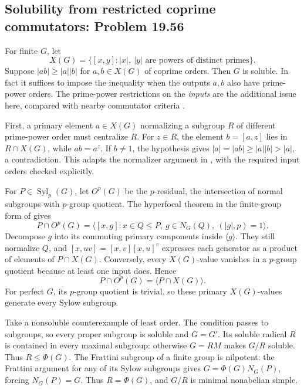 \subsection{Solubility from restricted coprime commutators: Problem 19.56}
\label{cand:19.56}

For finite \(G\), let
\[
 X(G)=\{[x,y]: |x|,\ |y|\text{ are powers of distinct primes}\}.
\]
Suppose \(|ab|\geq|a||b|\) for \(a,b\in X(G)\) of
coprime orders. Then \(G\) is soluble. In fact it
suffices to impose the inequality when the outputs
\(a,b\) also have prime-power orders.
The prime-power restrictions on the \emph{inputs}
are the additional issue here, compared with nearby
commutator criteria \cite{monakhov-derived,bastos-monetta}.

First, a primary element \(a\in X(G)\) normalizing a
subgroup \(R\) of different prime-power order must
centralize \(R\). For \(z\in R\), the element
\(b=[a,z]\) lies in \(R\cap X(G)\), while
\(ab=a^z\). If \(b\ne1\), the hypothesis gives
\(|a|=|ab|\geq|a||b|>|a|\), a contradiction.
This adapts the normalizer argument in
\cite{monakhov-derived}, with the required input
orders checked explicitly.

For \(P\in\operatorname{Syl}_p(G)\), let \(O^p(G)\)
be the \(p\)-residual, the intersection of normal
subgroups with \(p\)-group quotient. The hyperfocal
theorem in the finite-group form of
\cite[Lemma 2.2]{bcglo} gives
\[
 P\cap O^p(G)=
 \langle [x,g]:x\in Q\leq P,\ g\in N_G(Q),\
                                      (|g|,p)=1\rangle.
\]
Decompose \(g\) into its commuting primary
components inside \(\langle g\rangle\).
They still normalize \(Q\), and
\([x,uv]=[x,v][x,u]^v\) expresses each generator
as a product of elements of \(P\cap X(G)\).
Conversely, every \(X(G)\)-value vanishes in
a \(p\)-group quotient because at least one input
does. Hence
\[
 P\cap O^p(G)=\langle P\cap X(G)\rangle.
\]
For perfect \(G\), its \(p\)-group quotient is
trivial, so these primary \(X(G)\)-values generate
every Sylow subgroup.

Take a nonsoluble counterexample of least order.
The condition passes to subgroups, so every proper
subgroup is soluble and \(G=G'\).
Its soluble radical \(R\) is contained in every
maximal subgroup: otherwise \(G=RM\) makes
\(G/R\) soluble. Thus \(R\leq\Phi(G)\).
The Frattini subgroup of a finite group is
nilpotent: the Frattini argument for any of
its Sylow subgroups gives
\(G=\Phi(G)N_G(P)\), forcing \(N_G(P)=G\).
Thus \(R=\Phi(G)\), and \(G/R\) is minimal
nonabelian simple.

